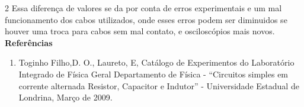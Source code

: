 \documentclass[a4paper, 12pt]{article}
\begin{document}
\begin{multicols}{2}
Essa diferença de valores se da por conta de erros experimentais e um mal funcionamento dos cabos utilizados, onde esses erros podem ser diminuidos se houver uma troca para cabos sem mal contato, e osciloscópios mais novos. \\


\noindent \textbf{\Large Referências}
\begin{enumerate}
\item Toginho Filho,D. O., Laureto, E, Catálogo de Experimentos do Laboratório Integrado de Física Geral Departamento de Física - “Circuitos simples em corrente alternada Resistor, Capacitor e Indutor” - Universidade Estadual de Londrina, Março de 2009.









\end{enumerate}
\end{multicols}
\end{document}
